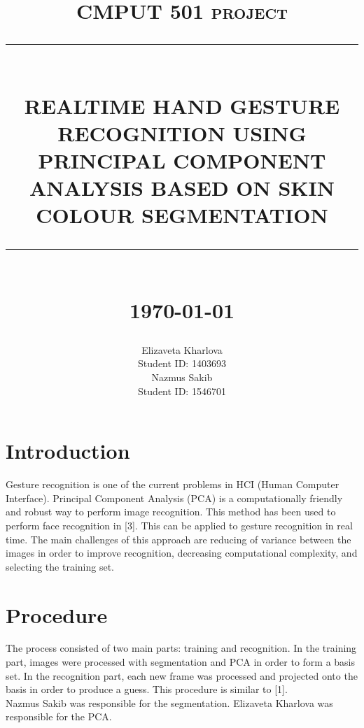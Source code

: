 \documentclass[12pt]{report}
\newcommand{\HRule}[1]{\rule{\linewidth}{#1}}
\begin{document}
\title{ \normalsize \textsc{CMPUT 501 project}
		\\ [2.0cm]
		\HRule{0.5pt} \\
		\LARGE \textbf{\uppercase{Realtime Hand Gesture Recognition using Principal Component analysis based on skin colour segmentation}}
		\HRule{2pt} \\ [0.5cm]
		\normalsize \today \vspace*{5\baselineskip}}

\date{}

\author{
		Elizaveta Kharlova \\
		Student ID: 1403693 \\
        Nazmus Sakib\\
        Student ID: 1546701}

\maketitle
\tableofcontents
\newpage

\sectionfont{\scshape}


\section*{Introduction}
Gesture recognition is one of the current problems in HCI (Human Computer Interface). Principal Component Analysis (PCA) is a computationally friendly and robust way to perform image recognition. This method has been used to perform face recognition in [3]. This can be applied to gesture recognition in real time. The main challenges of this approach are reducing of variance between the images in order to improve recognition, decreasing computational complexity, and selecting the training set. 

\section*{Procedure}
The process consisted of two main parts: training and recognition. In the training part, images were processed with segmentation and PCA in order to form a basis set. In the recognition part, each new frame was processed and projected onto the basis in order to produce a guess. This procedure is similar to [1].\\
\newline
Nazmus Sakib was responsible for the segmentation. Elizaveta Kharlova was responsible for the PCA.
\end{document}
